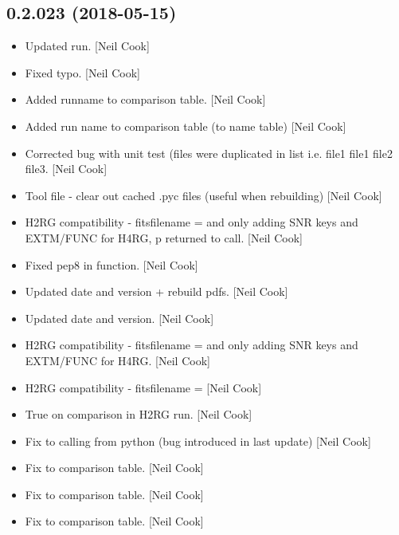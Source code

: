 \documentclass[a4paper,10pt,english]{report}
\begin{document}
\subsection{0.2.023 (2018-05-15)}
\label{\detokenize{misc/changelog:id438}}\begin{itemize}
\item {} 
Updated run. {[}Neil Cook{]}

\item {} 
Fixed typo. {[}Neil Cook{]}

\item {} 
Added runname to comparison table. {[}Neil Cook{]}

\item {} 
Added run name to comparison table (to name table) {[}Neil Cook{]}

\item {} 
Corrected bug with unit test (files were duplicated in list i.e. file1
file1 file2 file3. {[}Neil Cook{]}

\item {} 
Tool file - clear out cached .pyc files (useful when rebuilding) {[}Neil
Cook{]}

\item {} 
H2RG compatibility - fitsfilename =  and only adding
SNR keys and EXTM/FUNC for H4RG, p returned to call. {[}Neil Cook{]}

\item {} 
Fixed pep8 in  function. {[}Neil Cook{]}

\item {} 
Updated date and version + rebuild pdfs. {[}Neil Cook{]}

\item {} 
Updated date and version. {[}Neil Cook{]}

\item {} 
H2RG compatibility - fitsfilename =  and only adding
SNR keys and EXTM/FUNC for H4RG. {[}Neil Cook{]}

\item {} 
H2RG compatibility - fitsfilename =  {[}Neil Cook{]}

\item {} 
True on comparison in H2RG run. {[}Neil Cook{]}

\item {} 
Fix to calling from python (bug introduced in last update) {[}Neil Cook{]}

\item {} 
Fix to  comparison table. {[}Neil Cook{]}

\item {} 
Fix to  comparison table. {[}Neil Cook{]}

\item {} 
Fix to  comparison table. {[}Neil Cook{]}

\end{itemize}
\end{document}
